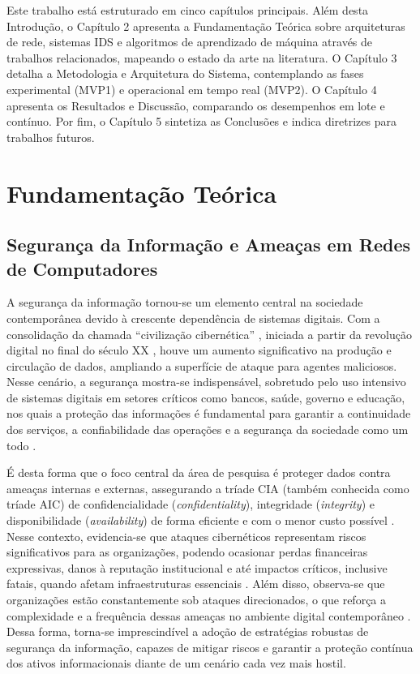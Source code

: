\documentclass[a4paper,10pt, twocolumn]{article}
\begin{document}
Este trabalho está estruturado em cinco capítulos principais. Além desta Introdução, 
o Capítulo 2 apresenta a Fundamentação Teórica sobre arquiteturas de rede, 
sistemas IDS e algoritmos de aprendizado de máquina através de trabalhos relacionados, 
mapeando o estado da arte na literatura. O Capítulo 3 detalha a Metodologia e 
Arquitetura do Sistema, contemplando as fases experimental (MVP1) e operacional em 
tempo real (MVP2). O Capítulo 4 apresenta os Resultados e Discussão, comparando os 
desempenhos em lote e contínuo. Por fim, o Capítulo 5 sintetiza as Conclusões e 
indica diretrizes para trabalhos futuros.

\section{Fundamentação Teórica}

\subsection{Segurança da Informação e Ameaças em Redes de Computadores}
A segurança da informação tornou-se um elemento central na sociedade 
contemporânea devido à crescente dependência de sistemas digitais. Com a 
consolidação da chamada “civilização cibernética” \cite{wasyhun2023cyber}, iniciada a partir da 
revolução digital no final do século XX \cite{Kazi2019network}, houve um aumento significativo na 
produção e circulação de dados, ampliando a superfície de ataque para agentes 
maliciosos. Nesse cenário, a segurança mostra-se indispensável, sobretudo 
pelo uso intensivo de sistemas digitais em setores críticos como bancos, 
saúde, governo e educação, nos quais a proteção das informações é fundamental 
para garantir a continuidade dos serviços, a confiabilidade das operações e a 
segurança da sociedade como um todo \cite{wasyhun2023cyber}.

É desta forma que o foco central da área de pesquisa é proteger dados contra 
ameaças internas e externas, assegurando a tríade CIA (também conhecida como tríade AIC) de confidencialidade (\textit{confidentiality}), 
integridade (\textit{integrity}) e disponibilidade (\textit{availability}) de forma eficiente e com o menor custo 
possível \cite{diptiben2022cyber}. Nesse contexto, evidencia-se que ataques cibernéticos representam 
riscos significativos para as organizações, podendo ocasionar perdas 
financeiras expressivas, danos à reputação institucional e até impactos 
críticos, inclusive fatais, quando afetam infraestruturas essenciais \cite{wasyhun2023cyber}. Além 
disso, observa-se que organizações estão constantemente sob ataques 
direcionados, o que reforça a complexidade e a frequência dessas ameaças no 
ambiente digital contemporâneo \cite{diptiben2022cyber}. Dessa forma, torna-se imprescindível a adoção 
de estratégias robustas de segurança da informação, capazes de mitigar riscos 
e garantir a proteção contínua dos ativos informacionais diante de um cenário 
cada vez mais hostil.
\end{document}
